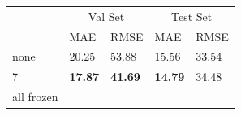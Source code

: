 \begin{tabular}{lllll}
    \toprule
    & \multicolumn{2}{c}{Val Set} & \multicolumn{2}{c}{Test Set} \\
    & MAE & RMSE & MAE & RMSE\\
    \midrule
    none & 20.25 & 53.88 & 15.56 & 33.54  \\
    7 & \textbf{17.87}  & \textbf{41.69} &  \textbf{14.79} & 34.48 \\
    all frozen & \\
    \bottomrule
\end{tabular}

 



